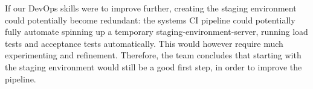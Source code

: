 If our DevOps skills were to improve further, creating the staging environment could potentially become redundant: the systems CI pipeline could potentially fully automate spinning up a temporary staging-environment-server, running load tests and acceptance tests automatically. This would however require much experimenting and refinement. Therefore, the team concludes that starting with the staging environment would still be a good first step, in order to improve the pipeline.